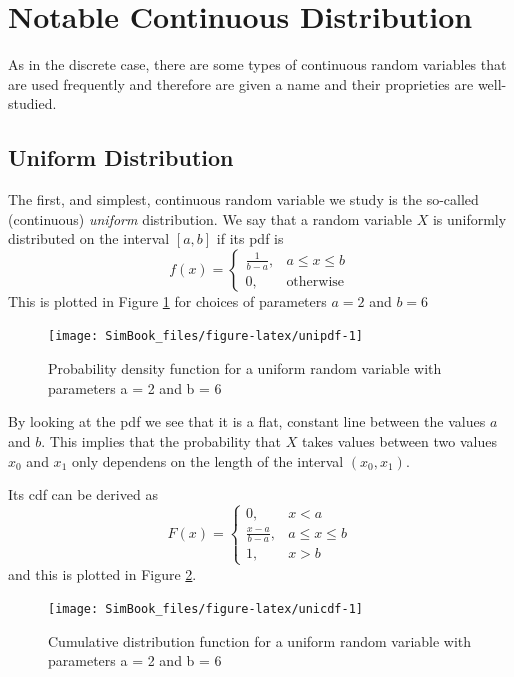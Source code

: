 \documentclass[
]{book}
\begin{document}
\hypertarget{notable-continuous-distribution}{%
\section{Notable Continuous Distribution}\label{notable-continuous-distribution}}

As in the discrete case, there are some types of continuous random variables that are used frequently and therefore are given a name and their proprieties are well-studied.

\hypertarget{uniform-distribution}{%
\subsection{Uniform Distribution}\label{uniform-distribution}}

The first, and simplest, continuous random variable we study is the so-called (continuous) \emph{uniform} distribution. We say that a random variable \(X\) is uniformly distributed on the interval \([a,b]\) if its pdf is
\[
f(x)=\left\{ 
\begin{array}{ll}
\frac{1}{b-a}, & a\leq x \leq b\\
0, & \mbox{otherwise} 
\end{array}
\right.
\]
This is plotted in Figure \ref{fig:unipdf} for choices of parameters \(a=2\) and \(b=6\)

\begin{figure}

{\centering \texttt{[image: SimBook\_files/figure-latex/unipdf-1]} 

}

\caption{Probability density function for a uniform random variable with parameters a = 2 and b = 6}\label{fig:unipdf}
\end{figure}

By looking at the pdf we see that it is a flat, constant line between the values \(a\) and \(b\). This implies that the probability that \(X\) takes values between two values \(x_0\) and \(x_1\) only dependens on the length of the interval \((x_0,x_1)\).

Its cdf can be derived as
\[
F(x)=\left\{
\begin{array}{ll}
0, & x<a\\
\frac{x-a}{b-a}, & a\leq x \leq b\\
1, & x>b
\end{array}
\right.
\]
and this is plotted in Figure \ref{fig:unicdf}.

\begin{figure}

{\centering \texttt{[image: SimBook\_files/figure-latex/unicdf-1]} 

}

\caption{Cumulative distribution function for a uniform random variable with parameters a = 2 and b = 6}\label{fig:unicdf}
\end{figure}
\end{document}

